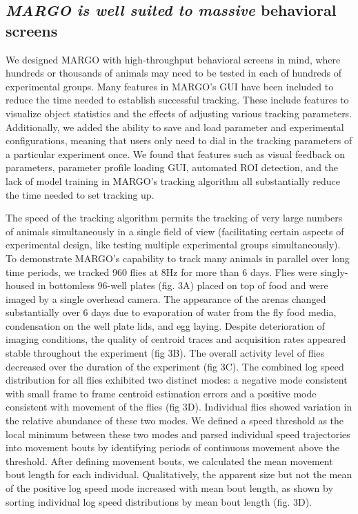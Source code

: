 \documentclass[10pt]{article}
\begin{document}
\begin{multicols}{2}
\subsection*{\textit{MARGO is well suited to massive} behavioral screens}

We designed MARGO with high-throughput behavioral screens in mind, where hundreds or thousands of animals may need to be tested in each of hundreds of experimental groups. Many features in MARGO's GUI have been included to reduce the time needed to establish successful tracking. These include features to visualize object statistics and the effects of adjusting various tracking parameters. Additionally, we added the ability to save and load parameter and experimental configurations, meaning that users only need to dial in the tracking parameters of a particular experiment once. We found that features such as visual feedback on parameters, parameter profile loading GUI, automated ROI detection, and the lack of model training in MARGO's tracking algorithm all substantially reduce the time needed to set tracking up. 

The speed of the tracking algorithm permits the tracking of very large numbers of animals simultaneously in a single field of view (facilitating certain aspects of experimental design, like testing multiple experimental groups simultaneously). To demonstrate MARGO's capability to track many animals in parallel over long time periods, we tracked 960 flies at 8Hz for more than 6 days. Flies were singly-housed in bottomless 96-well plates (fig. 3A) placed on top of food and were imaged by a single overhead camera. The appearance of the arenas changed substantially over 6 days due to evaporation of water from the fly food media, condensation on the well plate lids, and egg laying. Despite deterioration of imaging conditions, the quality of centroid traces and acquisition rates appeared stable throughout the experiment (fig 3B). The overall activity level of flies decreased over the duration of the experiment (fig 3C). The  combined log speed distribution for all flies exhibited two distinct modes: a negative mode consistent with small frame to frame centroid estimation errors and a positive mode consistent with movement of the flies (fig 3D). Individual flies showed variation in the relative abundance of these two modes. We defined a speed threshold as the local minimum between these two modes and parsed individual speed trajectories into movement bouts by identifying periods of continuous movement above the threshold. After defining movement bouts, we calculated the mean movement bout length for each individual. Qualitatively, the apparent size but not the mean of the positive log speed mode increased with mean bout length, as shown by sorting individual log speed distributions by mean bout length (fig. 3D).


\end{multicols}
\end{document}
